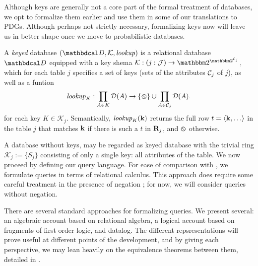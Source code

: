 \documentclass[the-pdg-manual.tex]{subfiles}
\begin{document}
Although keys are generally not a core part of the formal treatment of databases, we opt to formalize them earlier and use them in some of our translations to PDGs. Although perhaps not strictly necessary, formalizing keys now will leave us in better shape once we move to probabilistic databases. 

\begin{defn}
	A \emph{keyed} database $(\D, \mathcal K, \mathit{lookup})$ is a relational database $\D$ %
	equipped with a key shema $\mathcal K : (j:\Idx) \to \two^{\two^{\Cols_j}}$, which for each table $j$ specifies a set of keys (sets of the attributes $\mathcal C_j$ of $j$), as well as a funtion 
	$$\textit{lookup}_K : \prod_{A \in K}{\mathcal D}(A) \to \{\varobslash\} \cup \prod_{A \in \mathcal C_j}{\mathcal D}(A).$$
	for each key $K \in \mathcal K_j$. Semantically, $\mathit{lookup}_K(\mathbf k)$ returns the full row $t = \langle \mathbf k, \ldots \rangle$ in the table $j$ that matches $\mathbf k$ if there is such a $t$ in ${\mathbf R}_j$, and $\varobslash$ otherwise.
\end{defn}

A database without keys, may be regarded as keyed database with the trivial ring $\mathcal K_j := \{ S_j \}$ consisting of only a single key: all attributes of the table.
We now proceed by defining our query language. For ease of comparison with \cite{suciu2011probabilistic}, we formulate queries in terms of relational calculus. This approach does require some careful treatment in the presence of negation \cite[Chapter 5]{abiteboul1995foundations}; for now, we will consider queries without negation.

There are several standard approaches for formalizing queries. We present several: an algebraic account based on relational algebra, a logical account based on fragments of first order logic, and datalog. The different repsresentations will prove useful at different points of the development, and by giving each perspective, we may lean heavily on the equivalence theorems between them, detailed  in \cite{abiteboul1995foundations}.
\end{document}
